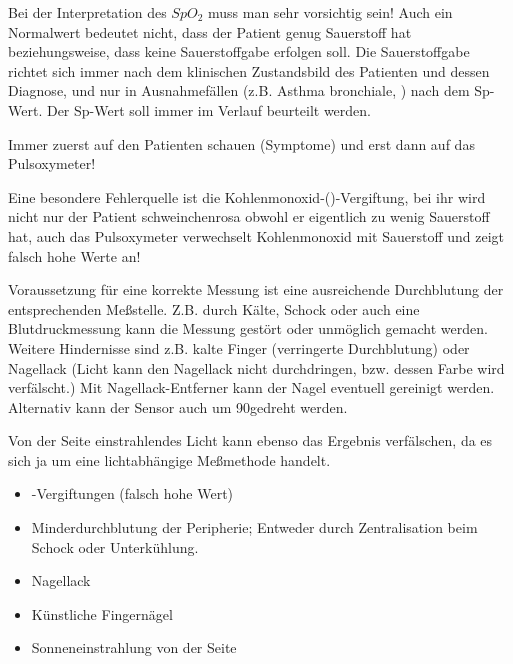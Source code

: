 {
Bei der Interpretation des
$SpO_2$ muss man sehr vorsichtig sein! Auch ein Normalwert bedeutet nicht, dass der Patient
genug Sauerstoff hat beziehungsweise, dass keine
Sauerstoffgabe erfolgen soll. Die Sauerstoffgabe richtet
sich immer nach dem klinischen
Zustandsbild des Patienten und dessen Diagnose, und nur in
Ausnahmefällen (z.B. Asthma bronchiale,
) nach dem
Sp-Wert. Der Sp-Wert soll immer im Verlauf beurteilt werden. 
\cite{soehnke200607}
}{
{\SymbolText}
}


Immer
zuerst auf den Patienten schauen (Symptome) und erst dann auf das Pulsoxymeter!



{
Eine besondere Fehlerquelle ist die
Kohlenmonoxid-()-Vergiftung, bei ihr wird nicht nur
der Patient schweinchenrosa obwohl er eigentlich zu wenig
Sauerstoff hat, auch das Pulsoxymeter verwechselt
Kohlenmonoxid mit Sauerstoff und zeigt falsch hohe Werte an!

Voraussetzung für eine korrekte Messung ist eine ausreichende
Durchblutung der entsprechenden Meßstelle. Z.B. durch Kälte,
Schock oder auch eine Blutdruckmessung kann die Messung
gestört oder unmöglich gemacht werden. Weitere Hindernisse
sind z.B. kalte Finger (verringerte Durchblutung) oder
Nagellack (Licht kann den Nagellack nicht durchdringen,
bzw. dessen Farbe wird verfälscht.) Mit
Nagellack-Entferner kann der Nagel eventuell
gereinigt werden. Alternativ kann der Sensor auch
um 90\textdegree gedreht werden. 

Von der Seite einstrahlendes Licht kann ebenso das Ergebnis
verfälschen, da es sich ja um eine lichtabhängige
Meßmethode handelt.
}{
\begin{itemize}
	\item {}-Vergiftungen (falsch hohe Wert)
	\item Minderdurchblutung der Peripherie; Entweder durch Zentralisation beim Schock oder Unterkühlung.
	\item Nagellack
	\item Künstliche Fingernägel
	\item Sonneneinstrahlung von der Seite
\end{itemize}
}{}{}{}




